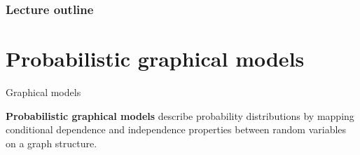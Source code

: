 
 





    

\begin{frame}
\frametitle{Lecture outline}
\tableofcontents
\end{frame}


\section{Probabilistic graphical models}



\begin{frame}{Graphical models}
    
    
    \begin{center}
    \begin{minipage}{.9\textwidth}
    \begin{block}{}
    \begin{center}
    \textbf{Probabilistic graphical models}
    describe probability distributions
    by mapping conditional dependence and independence properties
    between random variables
    on a graph structure.
    \end{center}
    \end{block}
    \end{minipage}
    \end{center}

\end{frame}



